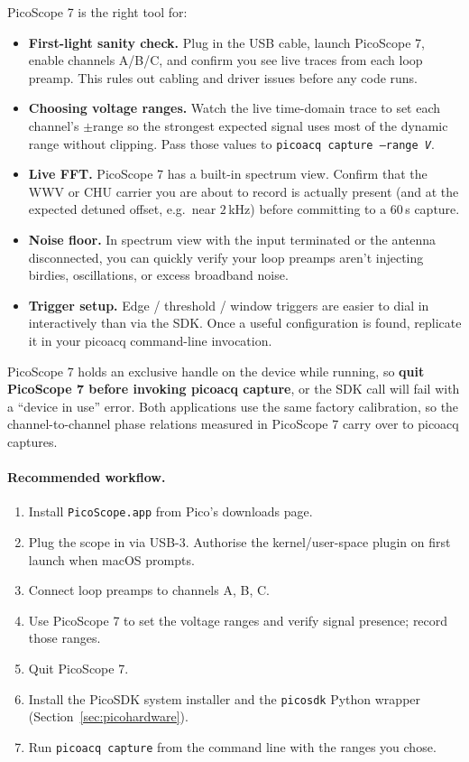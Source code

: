 \documentclass[11pt]{article}
\begin{document}
PicoScope 7 is the right tool for:

\begin{itemize}\itemsep=2pt
\item \textbf{First-light sanity check.}  Plug in the USB cable, launch
      PicoScope 7, enable channels A/B/C, and confirm you see live
      traces from each loop preamp.  This rules out cabling and driver
      issues before any code runs.
\item \textbf{Choosing voltage ranges.}  Watch the live time-domain
      trace to set each channel's $\pm$range so the strongest expected
      signal uses most of the dynamic range without clipping.  Pass
      those values to \texttt{picoacq capture --range\,\textit{V}}.
\item \textbf{Live FFT.}  PicoScope 7 has a built-in spectrum view.
      Confirm that the WWV or CHU carrier you are about to record is
      actually present (and at the expected detuned offset, e.g.\ near
      $2$\,kHz) before committing to a 60\,s capture.
\item \textbf{Noise floor.}  In spectrum view with the input
      terminated or the antenna disconnected, you can quickly verify
      your loop preamps aren't injecting birdies, oscillations, or
      excess broadband noise.
\item \textbf{Trigger setup.}  Edge / threshold / window triggers are
      easier to dial in interactively than via the SDK.  Once a useful
      configuration is found, replicate it in your \textsf{picoacq}
      command-line invocation.
\end{itemize}

PicoScope 7 holds an exclusive handle on the device while running, so
\textbf{quit PicoScope 7 before invoking \textsf{picoacq capture}}, or
the SDK call will fail with a ``device in use'' error.  Both
applications use the same factory calibration, so the channel-to-channel
phase relations measured in PicoScope 7 carry over to \textsf{picoacq}
captures.

\paragraph{Recommended workflow.}
\begin{enumerate}\itemsep=2pt
\item Install \texttt{PicoScope.app} from Pico's downloads page.
\item Plug the scope in via USB-3.  Authorise the kernel/user-space
      plugin on first launch when macOS prompts.
\item Connect loop preamps to channels A, B, C.
\item Use PicoScope 7 to set the voltage ranges and verify signal
      presence; record those ranges.
\item Quit PicoScope 7.
\item Install the PicoSDK system installer and the \texttt{picosdk}
      Python wrapper (Section~\ref{sec:picohardware}).
\item Run \texttt{picoacq capture} from the command line with the
      ranges you chose.
\end{enumerate}
\end{document}

